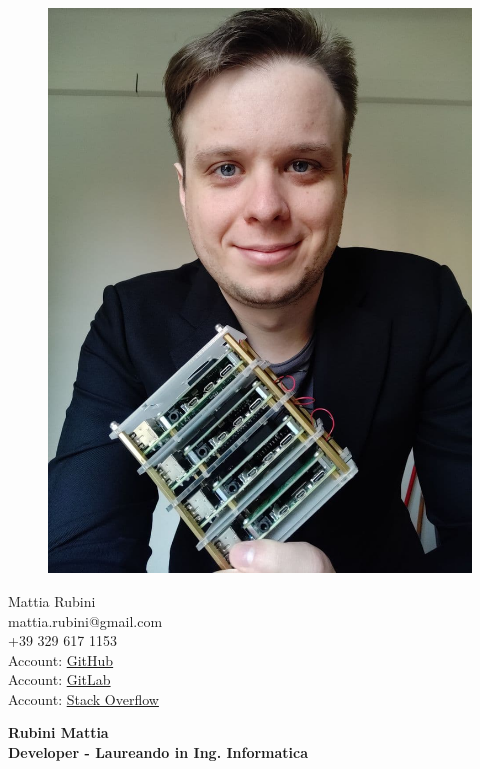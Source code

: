 \documentclass[a4paper,12pt,final]{memoir}
\begin{document}
\begin{figure}
	\hfill
	\includegraphics[width=1\columnwidth, angle=0]{photo-Mattia}
	\vspace{-7cm}
\end{figure}

\begin{flushright}\small
	Mattia Rubini \\
	mattia.rubini@gmail.com \\
	+39 329 617 1153 \\
	Account: 
	\href{https://github.com/Mot93}{GitHub}\\
	Account:
	\href{https://gitlab.com/mattia.rubini}{GitLab}\\
	Account:
	\href{https://stackoverflow.com/users/6875945/mattia-rubini}{Stack Overflow}
\end{flushright}\normalsize
\framebreak


\Huge\bfseries {\color{RoyalBlue} Rubini Mattia} \\
\Large\bfseries  Developer - Laureando in Ing. Informatica \\
\end{document}
